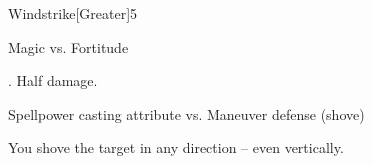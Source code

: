 \begin{spellsection}{Windstrike}[Greater]{5}
    \begin{spellheader}
    \end{spellheader}
    \begin{spellcontent}
        \begin{spelltargetinginfo}
        \end{spelltargetinginfo}
        \begin{spelleffects}
            \begin{spellattack}{Magic vs. Fortitude}
                \begin{spellmargin}
                    \spellsuccess {}.
                    \spellfailure Half damage.
                \end{spellmargin}
                \spellatk Spellpower \add casting attribute  vs. Maneuver defense (shove)
                \begin{spellmargin}
                    \spellsuccess You shove the target in any direction -- even vertically.
                \end{spellmargin}
            \end{spellattack}
        \end{spelleffects}
    \end{spellcontent}
    \begin{spellfooter}
        \miscastrandom
    \end{spellfooter}
\end{spellsection}

